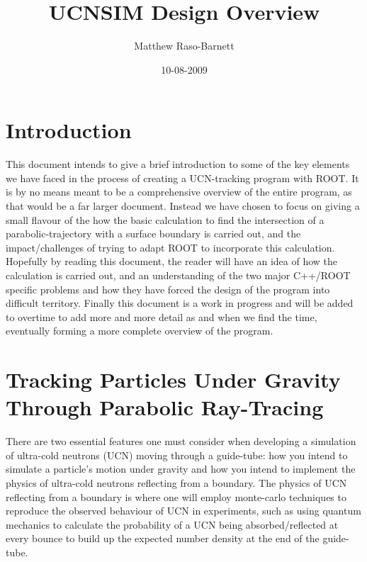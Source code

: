 \documentclass[11pt,a4paper,oneside]{article}
\title{UCNSIM Design Overview}
\author{Matthew Raso-Barnett}
\date{10-08-2009}
\begin{document}


\maketitle


\section{Introduction}

This document intends to give a brief introduction to some of the key elements we have faced in the process of creating a UCN-tracking program with ROOT. It is by no means meant to be a comprehensive overview of the entire program, as that would be a far larger document. Instead we have chosen to focus on giving a small flavour of the how the basic calculation to find the intersection of a parabolic-trajectory with a surface boundary is carried out, and the impact/challenges of trying to adapt ROOT to incorporate this calculation. Hopefully by reading this document, the reader will have an idea of how the calculation is carried out, and an understanding of the two major C++/ROOT specific 
problems and how they have forced the design of the program into difficult territory. Finally this document is a work in progress and will be added to overtime to add more and more detail as and when we find the time, eventually forming a more complete overview of the program.

\section{Tracking Particles Under Gravity Through Parabolic Ray-Tracing}

There are two essential features one must consider when developing a simulation of ultra-cold neutrons (UCN) moving through a guide-tube: how you intend to simulate a particle's motion under gravity and how you intend to implement the physics of ultra-cold neutrons reflecting from a boundary. The physics of UCN reflecting from a boundary is where one will employ monte-carlo techniques to reproduce the observed behaviour of UCN in experiments, such as using quantum mechanics to calculate the probability of a UCN being absorbed/reflected at every bounce to build up the expected number density at the end of the guide-tube. 
\end{document}
